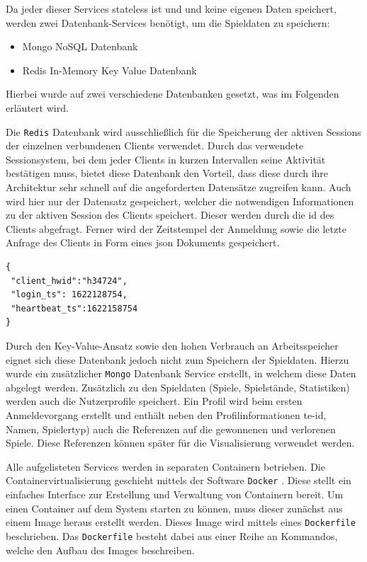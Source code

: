 Da jeder dieser Services stateless ist und und keine eigenen Daten
speichert, werden zwei Datenbank-Services benötigt, um die Spieldaten zu
speichern:

\begin{itemize}
\tightlist
\item
  Mongo NoSQL Datenbank
\item
  Redis In-Memory Key Value Datenbank
\end{itemize}

Hierbei wurde auf zwei verschiedene Datenbanken gesetzt, was im
Folgenden erläutert wird.

Die \passthrough{\lstinline!Redis!} \cite{redis} Datenbank wird
ausschließlich für die Speicherung der aktiven Sessions der einzelnen
verbundenen Clients verwendet. Durch das verwendete Sessionsystem, bei
dem jeder Clients in kurzen Intervallen seine Aktivität bestätigen muss,
bietet diese Datenbank den Vorteil, dass diese durch ihre Architektur
sehr schnell auf die angeforderten Datensätze zugreifen kann. Auch wird
hier nur der Datensatz gespeichert, welcher die notwendigen
Informationen zu der aktiven Session des Clients speichert. Dieser
werden durch die \gls{id} des Clients abgefragt. Ferner wird der
Zeitstempel der Anmeldung sowie die letzte Anfrage des Clients in Form
eines \gls{json} Dokuments gespeichert.

\begin{lstlisting}
{
 "client_hwid":"h34724",
 "login_ts": 1622128754,
 "heartbeat_ts":1622158754
}
\end{lstlisting}

Durch den Key-Value-Ansatz sowie den hohen Verbrauch an Arbeitsspeicher
eignet sich diese Datenbank jedoch nicht zum Speichern der Spieldaten.
Hierzu wurde ein zusätzlicher \passthrough{\lstinline!Mongo!}
\cite{mogodb} Datenbank Service erstellt, in welchem diese Daten
abgelegt werden. Zusätzlich zu den Spieldaten (Spiele, Spielstände,
Statistiken) werden auch die Nutzerprofile speichert. Ein Profil wird
beim ersten Anmeldevorgang erstellt und enthält neben den
Profilinformationen te-\gls{id}, Namen, Spielertyp) auch die Referenzen
auf die gewonnenen und verlorenen Spiele. Diese Referenzen können später
für die Visualisierung verwendet werden.

Alle aufgelisteten Services werden in separaten Containern betrieben.
Die Containervirtualisierung geschieht mittels der Software
\passthrough{\lstinline!Docker!} \cite{docker}. Diese stellt ein
einfaches Interface zur Erstellung und Verwaltung von Containern bereit.
Um einen Container auf dem System starten zu können, muss dieser
zunächst aus einem Image heraus erstellt werden. Dieses Image wird
mittels eines \passthrough{\lstinline!Dockerfile!} beschrieben. Das
\passthrough{\lstinline!Dockerfile!} besteht dabei aus einer Reihe an
Kommandos, welche den Aufbau des Images beschreiben.

